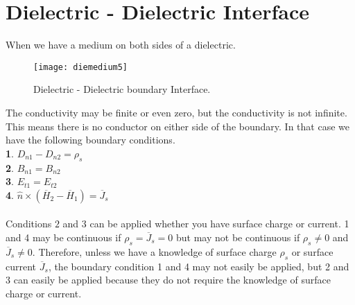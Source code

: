   \section{Dielectric - Dielectric Interface}
  When we have a medium on both sides of a dielectric.
      \begin{figure}[h]
      	\centering
      	\texttt{[image: diemedium5]}
      	\caption{Dielectric - Dielectric boundary Interface.}
      \end{figure}
  The conductivity may be finite or even zero, but the conductivity is not infinite. This means there is no conductor on either side of the boundary. In that case we have the following boundary conditions.\\
  \textbf{1}. $D_{n1} - D_{n2} = \rho_s$\\
  \textbf{2}. $B_{n1} = B_{n2}$\\
  \textbf{3}. $E_{t1} = E_{t2}$\\
  \textbf{4}. $\hat{n} \times (\overline{H}_2 - \overline{H}_1) = \overline{J}_s$\\ \\
  Conditions $2$ and $3$ can be applied whether you have surface charge or current. 1 and 4 may be continuous if $\rho_s = \overline{J}_s = 0$ but may not be continuous if $\rho_s\neq 0$ and $\overline{J}_s\neq 0$.
  Therefore, unless we have a knowledge of surface charge $\rho_s$ or surface current $\overline{J}_s$, the boundary condition 1 and 4 may not easily be applied, but 2 and 3 can easily be applied because they do not require the knowledge of surface charge or current.
